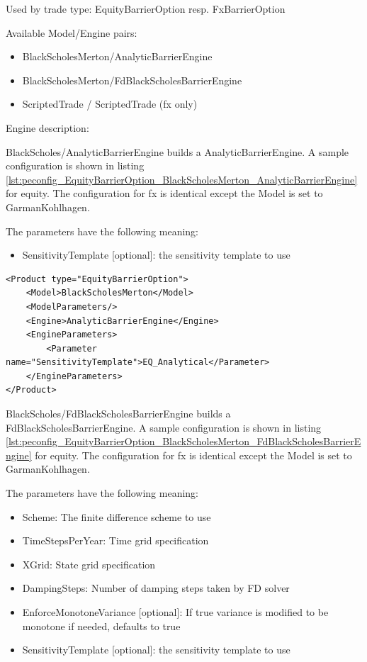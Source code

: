 Used by trade type: EquityBarrierOption resp. FxBarrierOption

Available Model/Engine pairs:

\begin{itemize}
\item BlackScholesMerton/AnalyticBarrierEngine
\item BlackScholesMerton/FdBlackScholesBarrierEngine
\item ScriptedTrade / ScriptedTrade (fx only)
\end{itemize}

Engine description:

BlackScholes/AnalyticBarrierEngine builds a AnalyticBarrierEngine. A sample configuration is shown in listing
\ref{lst:peconfig_EquityBarrierOption_BlackScholesMerton_AnalyticBarrierEngine} for equity. The configuration for fx is
identical except the Model is set to GarmanKohlhagen.

The parameters have the following meaning:

\begin{itemize}
\item SensitivityTemplate [optional]: the sensitivity template to use
\end{itemize}

\begin{longlisting}
\begin{verbatim}
<Product type="EquityBarrierOption">
    <Model>BlackScholesMerton</Model>
    <ModelParameters/>
    <Engine>AnalyticBarrierEngine</Engine>
    <EngineParameters>
        <Parameter name="SensitivityTemplate">EQ_Analytical</Parameter>
    </EngineParameters>
</Product>
\end{verbatim}
\caption{Configuration for Product EquityBarrierOption, Model BlackScholesMertong Engine AnalyticBarrierEngine}
\label{lst:peconfig_EquityBarrierOption_BlackScholesMerton_AnalyticBarrierEngine}
\end{longlisting}

BlackScholes/FdBlackScholesBarrierEngine builds a FdBlackScholesBarrierEngine. A sample configuration is shown in
listing \ref{lst:peconfig_EquityBarrierOption_BlackScholesMerton_FdBlackScholesBarrierEngine} for equity. The
configuration for fx is identical except the Model is set to GarmanKohlhagen.

The parameters have the following meaning:

\begin{itemize}
\item Scheme: The finite difference scheme to use
\item TimeStepsPerYear: Time grid specification
\item XGrid: State grid specification
\item DampingSteps: Number of damping steps taken by FD solver
\item EnforceMonotoneVariance [optional]: If true variance is modified to be monotone if needed, defaults to true
\item SensitivityTemplate [optional]: the sensitivity template to use
\end{itemize}

